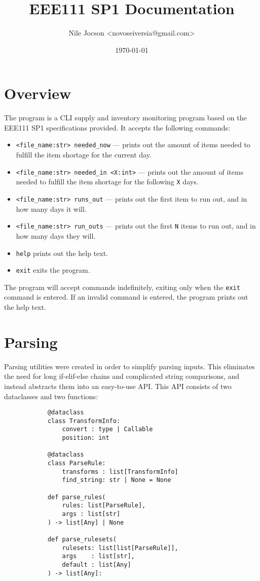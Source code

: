 \documentclass{article}
\title{EEE111 SP1 Documentation}
\author{Nile Jocson \textless{novoseiversia@gmail.com}\textgreater}
\date{\today}
\begin{document}
	\maketitle
		\pagebreak



	\tableofcontents
		\pagebreak



	\section{Overview}
		The program is a CLI supply and inventory monitoring program based on
		the EEE111 SP1 specifications provided. It accepts the following commands:

		\begin{itemize}
			\item \verb|<file_name:str> needed_now| --- prints out the amount of items
			needed to fulfill the item shortage for the current day.
			\item \verb|<file_name:str> needed_in <X:int>| --- prints out the amount of items
			needed to fulfill the item shortage for the following \verb|X| days.
			\item \verb|<file_name:str> runs_out| --- prints out the first item to run out, and
			in how many days it will.
			\item \verb|<file_name:str> run_outs| --- prints out the first \verb|N| items to run
			out, and in how many days they will.
			\item \verb|help| prints out the help text.
			\item \verb|exit| exits the program.
		\end{itemize}

		The program will accept commands indefinitely, exiting only when the \verb|exit| command is
		entered. If an invalid command is entered, the program prints out the help text.

		\pagebreak

	\section{Parsing}
		Parsing utilities were created in order to simplify parsing inputs. This eliminates the
		need for long if-elif-else chains and complicated string comparisons, and instead
		abstracts them into an easy-to-use API\@. This API consists of two dataclasses and
		two functions:

		\begin{verbatim}
			@dataclass
			class TransformInfo:
				convert : type | Callable
				position: int

			@dataclass
			class ParseRule:
				transforms : list[TransformInfo]
				find_string: str | None = None

			def parse_rules(
				rules: list[ParseRule],
				args : list[str]
			) -> list[Any] | None

			def parse_rulesets(
				rulesets: list[list[ParseRule]],
				args    : list[str],
				default : list[Any]
			) -> list[Any]:
		\end{verbatim}
\end{document}
